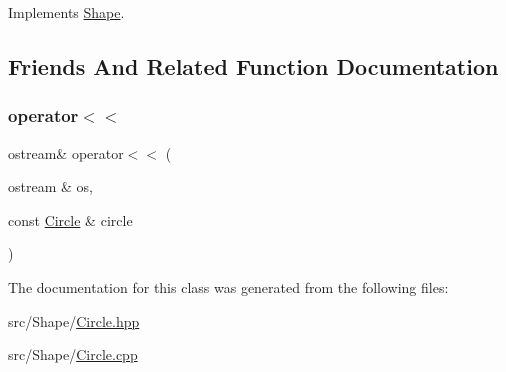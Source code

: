 Implements \hyperlink{class_shape_ad3daca0d9bedf9aa15b92afab63c1de8}{Shape}.



\subsection{Friends And Related Function Documentation}
\hypertarget{class_circle_aff122891f2c5c68c5016c71add530da2}{}\label{class_circle_aff122891f2c5c68c5016c71add530da2} 
\subsubsection{\texorpdfstring{operator$<$$<$}{operator<<}}
{\footnotesize\ttfamily ostream\& operator$<$$<$ (\begin{DoxyParamCaption}\item[{ostream \&}]{os,  }\item[{const \hyperlink{class_circle}{Circle} \&}]{circle }\end{DoxyParamCaption})\hspace{0.3cm}{\ttfamily [friend]}}



The documentation for this class was generated from the following files\+:\begin{DoxyCompactItemize}
\item 
src/\+Shape/\hyperlink{_circle_8hpp}{Circle.\+hpp}\item 
src/\+Shape/\hyperlink{_circle_8cpp}{Circle.\+cpp}\end{DoxyCompactItemize}
